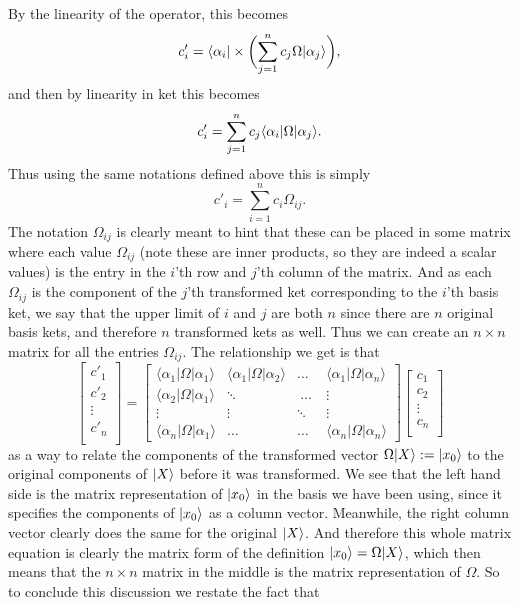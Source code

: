 By the linearity of the operator, this becomes
$$
c'_{i}=\langle\alpha_{i}|\times\biggl(\sum_{j=1}^{n}c_{j}\Omega|\alpha_{j}\rangle\biggr),
$$
and then by linearity in ket this becomes 
$$
c'_{i}=\sum_{j=1}^{n}c_{j}\langle\alpha_{i}|{\Omega}|\alpha_{j}\rangle.
$$
Thus using the same notations defined above this is simply
$$
c'_{i}=\sum_{i=1}^{n}c_{i}\Omega_{ij}.
$$
The notation $\Omega_{ij}$ is clearly meant to hint that these can be placed in some matrix where each value $\Omega_{ij}$ (note these are inner products, so they are indeed a scalar values) is the entry in the $i$'th row and $j$'th column of the matrix. And as each $\Omega_{ij}$ is the component of the $j$'th transformed ket corresponding to the $i$'th basis ket, we say that the upper limit of $i$ and $j$ are both $n$ since there are $n$ original basis kets, and therefore $n$ transformed kets as well. Thus we can create an $n\times n$ matrix for all the entries $\Omega_{ij}$. The relationship we get is that 
$$
\begin{bmatrix} 
c'_{1} \\ 
c'_{2} \\
\vdots \\ 
c'_{n} \\ 
\end{bmatrix}
=
\begin{bmatrix}
\langle{\alpha_{1}}|\Omega|{\alpha}_{1}\rangle & \langle{\alpha_{1}}|\Omega|{\alpha}_{2}\rangle &
\dots & \langle{\alpha_{1}}|\Omega|{\alpha}_{n}\rangle\\ 
\langle{\alpha_{2}}|\Omega|{\alpha}_{1}\rangle & \ddots &
\:\dots\: & \vdots \\
\vdots & \vdots & \ddots & \vdots\\ 
\langle{\alpha_{n}}|\Omega|{\alpha}_{1}\rangle & \dots & \dots & \langle{\alpha_{n}}|\Omega|{\alpha}_{n}\rangle
\end{bmatrix}
\begin{bmatrix} 
c_{1} \\ 
c_{2} \\
\vdots \\ 
c_{n} \\
\end{bmatrix}
$$
as a way to relate the components of the transformed vector $\Omega|X\rangle:=|x_{0}\rangle$ to the original components of $|X\rangle$ before it was transformed. We see that the left hand side is the matrix representation of $|x_{0}\rangle$ in the basis we have been using, since it specifies the components of $|x_{0}\rangle$ as a column vector. Meanwhile, the right column vector clearly does the same for the original $|X\rangle$. And therefore this whole matrix equation is clearly the matrix form of the definition $|x_{0}\rangle=\Omega|X\rangle$, which then means that the $n\times n$ matrix in the middle is the matrix representation of $\Omega$. So to conclude this discussion we restate the fact that 
